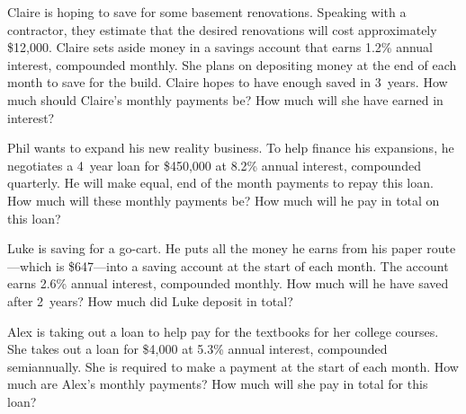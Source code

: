 \documentclass[11pt,letterpaper]{article}
\begin{document}

 Claire is hoping to save for some basement renovations. Speaking with a contractor, they estimate that the desired renovations will cost approximately \$12,000. Claire sets aside money in a savings account that earns 1.2\% annual interest, compounded monthly. She plans on depositing money at the end of each month to save for the build. Claire hopes to have enough saved in 3~years. How much should Claire's monthly payments be? How much will she have earned in interest? 



\newpage



 Phil wants to expand his new reality business. To help finance his expansions, he negotiates a 4~year loan for \$450,000 at 8.2\% annual interest, compounded quarterly. He will make equal, end of the month payments to repay this loan. How much will these monthly payments be? How much will he pay in total on this loan? 



\newpage



 Luke is saving for a go-cart. He puts all the money he earns from his paper route---which is \$647---into a saving account at the start of each month. The account earns 2.6\% annual interest, compounded monthly. How much will he have saved after 2~years? How much did Luke deposit in total? 



\newpage



 Alex is taking out a loan to help pay for the textbooks for her college courses. She takes out a loan for \$4,000 at 5.3\% annual interest, compounded semiannually. She is required to make a payment at the start of each month. How much are Alex's monthly payments? How much will she pay in total for this loan?
\end{document}
